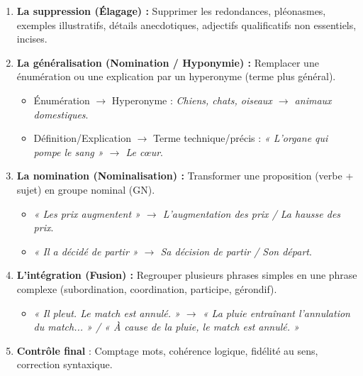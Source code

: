 \documentclass[11pt]{article}
\begin{document}
\begin{methode}
    \begin{enumerate}
        \item \textbf{La suppression (Élagage) :} Supprimer les redondances, pléonasmes, exemples illustratifs, détails anecdotiques, adjectifs qualificatifs non essentiels, incises.
        \item \textbf{La généralisation (Nomination / Hyponymie) :} Remplacer une énumération ou une explication par un hyperonyme (terme plus général).
            \begin{itemize}
                \item Énumération $\rightarrow$ Hyperonyme : \emph{Chiens, chats, oiseaux $\rightarrow$ animaux domestiques}.
                \item Définition/Explication $\rightarrow$ Terme technique/précis : \emph{« L'organe qui pompe le sang » $\rightarrow$ Le cœur}.
            \end{itemize}
        \item \textbf{La nomination (Nominalisation) :} Transformer une proposition (verbe + sujet) en groupe nominal (GN).
            \begin{itemize}
                \item \emph{« Les prix augmentent » $\rightarrow$ L'augmentation des prix / La hausse des prix}.
                \item \emph{« Il a décidé de partir » $\rightarrow$ Sa décision de partir / Son départ}.
            \end{itemize}
        \item \textbf{L'intégration (Fusion) :} Regrouper plusieurs phrases simples en une phrase complexe (subordination, coordination, participe, gérondif).
            \begin{itemize}
                \item \emph{« Il pleut. Le match est annulé. » $\rightarrow$ « La pluie entraînant l'annulation du match... » / « À cause de la pluie, le match est annulé. »}
            \end{itemize}
        \item \textbf{Contrôle final} : Comptage mots, cohérence logique, fidélité au sens, correction syntaxique.
    \end{enumerate}
\end{methode}
\end{document}
